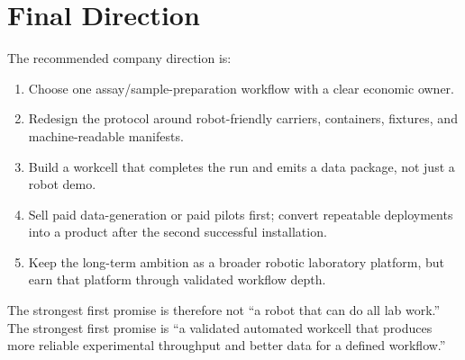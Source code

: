 \documentclass[11pt]{article}
\begin{document}
\clearpage
\section{Final Direction}

The recommended company direction is:

\begin{enumerate}
  \item Choose one assay/sample-preparation workflow with a clear economic owner.
  \item Redesign the protocol around robot-friendly carriers, containers, fixtures, and machine-readable manifests.
  \item Build a workcell that completes the run and emits a data package, not just a robot demo.
  \item Sell paid data-generation or paid pilots first; convert repeatable deployments into a product after the second successful installation.
  \item Keep the long-term ambition as a broader robotic laboratory platform, but earn that platform through validated workflow depth.
\end{enumerate}

The strongest first promise is therefore not ``a robot that can do all lab work.'' The strongest first promise is ``a validated automated workcell that produces more reliable experimental throughput and better data for a defined workflow.''
\end{document}
